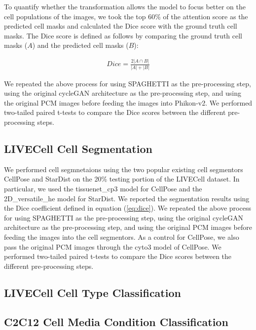 \begin{refsegment}
To quantify whether the transformation allows the model to focus better on the cell populations of the images, we took the top 60\% of the attention score as the predicted cell masks and calculated the Dice score with the ground truth cell masks. The Dice score is defined as follows by comparing the ground truth cell masks ($A$) and the predicted cell masks ($B$):

\begin{equation} \label{eq:dice}
  \begin{aligned}
    Dice = \frac{2|A \cap B|}{|A| + |B|}
  \end{aligned}
\end{equation}

We repeated the above process for using SPAGHETTI as the pre-processing step, using the original cycleGAN architecture as the pre-processing step, and using the original PCM images before feeding the images into Phikon-v2. We performed two-tailed paired t-tests to compare the Dice scores between the different pre-processing steps.

\subsection*{LIVECell Cell Segmentation}
We performed cell segmnetaions using the two popular existing cell segmentors CellPose \autocite{cellpose} and StarDist \autocite{stardist} on the 20\% testing portion of the LIVECell dataset. In particular, we used the tissuenet\_cp3 model for CellPose and the 2D\_versatile\_he model for StarDist. We reported the segmentation results using the Dice coefficient defined in equation (\ref{eq:dice}). We repeated the above process for using SPAGHETTI as the pre-processing step, using the original cycleGAN architecture as the pre-processing step, and using the original PCM images before feeding the images into the cell segmentors. As a control for CellPose, we also pass the original PCM images through the cyto3 model of CellPose. We performed two-tailed paired t-tests to compare the Dice scores between the different pre-processing steps.

\subsection*{LIVECell Cell Type Classification}

\subsection*{C2C12 Cell Media Condition Classification}


\end{refsegment}
